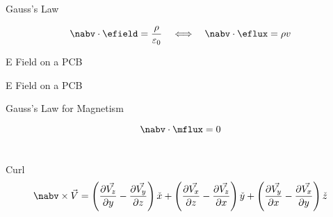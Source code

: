 \begin{frame}{Gauss's Law}
    \begin{twocolumns}[0.5]
    \leftcol
        \vspace{-8pt}
        \begin{equation}
            \nabv \cdot \efield = \frac{\rho}{\varepsilon_0}
            \hspace{1em} \Longleftrightarrow \hspace{1.0em}
            \nabv \cdot \eflux = \rho v
        \end{equation}
    \rightcol
    \end{twocolumns}
\end{frame}
 
\begin{frame}{E Field on a PCB}
    \vspace{-20pt}
\end{frame}

\begin{frame}{E Field on a PCB}
    \vspace{-20pt}
\end{frame}

\begin{frame}{Gauss's Law for Magnetism}
    \begin{twocolumns}[0.35]
        \leftcol
            \vspace{-8pt}
            \begin{equation}
                \nabv \cdot \mflux = 0
            \end{equation}\\
            \vspace{10pt}
        \rightcol
    \end{twocolumns}
\end{frame}


\begin{frame}{Curl}
    \begin{equation}
        \nabv \times \vec{V} = \left(\frac{\partial\vec{V_z}}{\partial y}-\frac{\partial\vec{V_y}}{\partial z} \right) \check{x} +
        \left(\frac{\partial\vec{V_x}}{\partial z}-\frac{\partial\vec{V_z}}{\partial x} \right) \check{y} +
        \left(\frac{\partial\vec{V_y}}{\partial x}-\frac{\partial\vec{V_x}}{\partial y} \right) \check{z}
    \end{equation}
    \vspace{-15pt}
\begin{twocolumns}[0.5]
    \leftcol
    \rightcol
 \end{twocolumns}
\end{frame}

